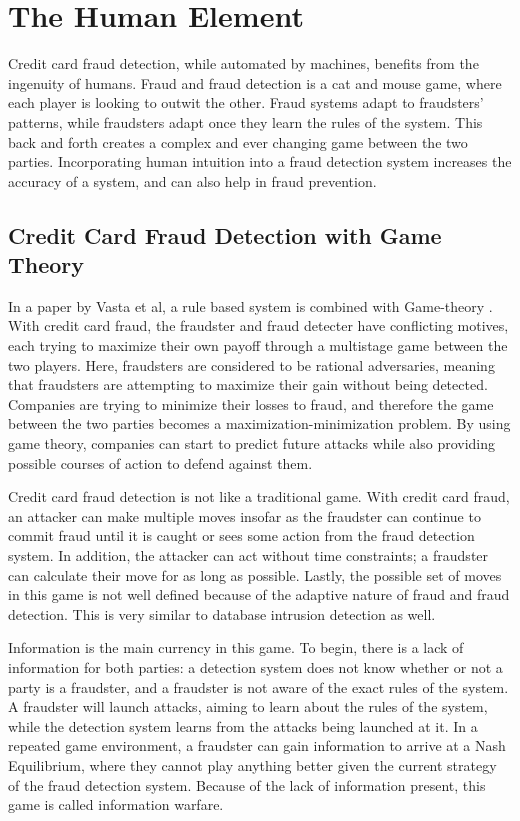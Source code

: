 \documentclass[midd]{thesis}
\begin{document}
\section{The Human Element}

Credit card fraud detection, while automated by machines, benefits from the ingenuity of humans. Fraud and fraud detection is a cat and mouse game, where each player is looking to outwit the other. Fraud systems adapt to fraudsters' patterns, while fraudsters adapt once they learn the rules of the system. This back and forth creates a complex and ever changing game between the two parties. Incorporating human intuition into a fraud detection system increases the accuracy of a system, and can also help in fraud prevention. 

\subsection{Credit Card Fraud Detection with Game Theory}

 
In a paper by Vasta et al, a rule based system is combined with Game-theory \cite{Vatsa2007}. With credit card fraud, the fraudster and fraud detecter have conflicting motives, each trying to maximize their own payoff through a multistage game between the two players. Here, fraudsters are considered to be rational adversaries, meaning that fraudsters are attempting to maximize their gain without being detected. Companies are trying to minimize their losses to fraud, and therefore the game between the two parties becomes a maximization-minimization problem. By using game theory, companies can start to predict future attacks while also providing possible courses of action to defend against them.
 
Credit card fraud detection is not like a traditional game. With credit card fraud, an attacker can make multiple moves insofar as the fraudster can continue to commit fraud until it is caught or sees some action from the fraud detection system. In addition, the attacker can act without time constraints; a fraudster can calculate their move for as long as possible. Lastly, the possible set of moves in this game is not well defined because of the adaptive nature of fraud and fraud detection. This is very similar to database intrusion detection as well. 

Information is the main currency in this game. To begin, there is a lack of information for both parties: a detection system does not know whether or not a party is a fraudster, and a fraudster is not aware of the exact rules of the system. A fraudster will launch attacks, aiming to learn about the rules of the system, while the detection system learns from the attacks being launched at it. In a repeated game environment, a fraudster can gain information to arrive at a Nash Equilibrium, where they cannot play anything better given the current strategy of the fraud detection system. Because of the lack of information present, this game is called information warfare.
\end{document}
